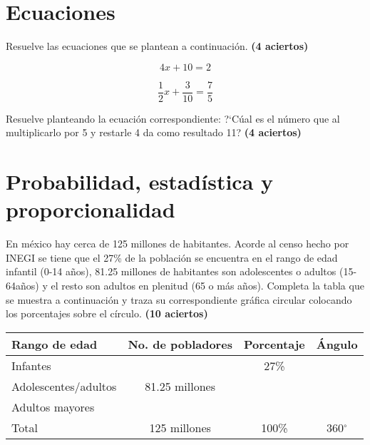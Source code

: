\documentclass[11pt]{article}
\begin{document}
\newpage

\setcounter{equation}{0}
\section{Ecuaciones}

Resuelve las ecuaciones que se plantean a continuaci\'on. \hfill \textbf{(4 aciertos)}

\begin{multicols}{2}

\begin{equation}
4x + 10 = 2
\end{equation}

\vspace{3cm}
\begin{equation}
\frac{1}{2} x + \frac{3}{10} = \frac{7}{5}
\end{equation}

\vspace{3cm}

\end{multicols}

\vspace{3.5cm}
Resuelve planteando la ecuaci\'on correspondiente: ?`C\'ual es el n\'umero que 
al multiplicarlo por 5 y restarle 4 da como resultado 11?
\hfill \textbf{(4 aciertos)}

\vspace{3.5cm}

\section{Probabilidad, estad\'istica y proporcionalidad}
En m\'exico hay cerca de 125 millones de habitantes. Acorde al censo hecho por
INEGI se tiene que el 27\% de la poblaci\'on se encuentra en el rango de edad
infantil (0-14 a\~nos), 81.25 millones de habitantes son adolescentes o adultos
(15-64a\~nos) y el resto son adultos en plenitud (65 o m\'as a\~nos). Completa
la tabla que se muestra a continuaci\'on y traza su correspondiente gr\'afica
circular colocando los porcentajes sobre el c\'irculo.
\hfill \textbf{(10 aciertos)}

\begin{center}
{\Large
\begin{tabular}{|l|c|c|c|}

\hline
\hline
Rango de edad & No. de pobladores & Porcentaje & \'Angulo \\
\hline
\hline
Infantes & & 27\% &  \\
\hline
Adolescentes/adultos & 81.25 millones & &  \\
\hline
Adultos mayores & &  &  \\
\hline
\hline
Total & 125 millones & 100\% & 360$^{\circ}$ \\
\hline
\hline

\end{tabular}
}
\end{center}
\end{document}
